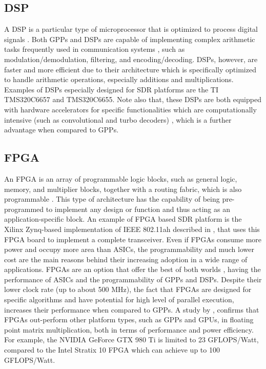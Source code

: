 \subsection{DSP}

A DSP is a particular type of microprocessor that is optimized to process digital signals \cite{rabiner1978a}. Both GPPs and DSPs are capable of implementing complex arithmetic tasks frequently used in communication systems \cite{smith1997a}, such as modulation/demodulation, filtering, and encoding/decoding. DSPs, however, are faster and more efficient due to their architecture which is specifically optimized to handle arithmetic operations, especially additions and multiplications. Examples of DSPs especially designed for SDR platforms are the TI TMS320C6657 and TMS320C6655. Note also that, these DSPs are both equipped with hardware accelerators for specific functionalities which are computationally intensive (such as convolutional and turbo decoders) \cite{unknown-i}, which is a further advantage when compared to GPPs.

\subsection{FPGA}

An FPGA is an array of programmable logic blocks, such as general logic, memory, and multiplier blocks, together with a routing fabric, which is also programmable \cite{kuon2008a}. This type of architecture has the capability of being pre-programmed to implement any design or function and thus acting as an application-specific block. An example of FPGA based SDR platform is the Xilinx Zynq-based implementation of IEEE 802.11ah described in \cite{80211ah_for_iot}, that uses this FPGA board to implement a complete transceiver. Even if FPGAs consume more power and occupy more area than ASICs, the programmability and much lower cost are the main reasons behind their increasing adoption in a wide range of applications. FPGAs are an option that offer the best of both worlds \cite{kuon2008a}, having the performance of ASICs and the programmability of GPPs and DSPs. Despite their lower clock rate (up to about 500 MHz), the fact that FPGAs are designed for specific algorithms and have potential for high level of parallel execution,  increases their performance when compared to GPPs\cite{sano2017a}. A study by \cite{kestur2010a}, confirms that FPGAs out-perform other platform types, such as GPPs and GPUs, in floating point matrix multiplication, both in terms of performance and power efficiency\cite{choi2003a}. For example, the NVIDIA GeForce GTX 980 Ti \cite{unknown-g} is limited to 23 GFLOPS/Watt, compared to the Intel Stratix 10 FPGA which can achieve up to 100 GFLOPS/Watt\cite{altera2010a}.


